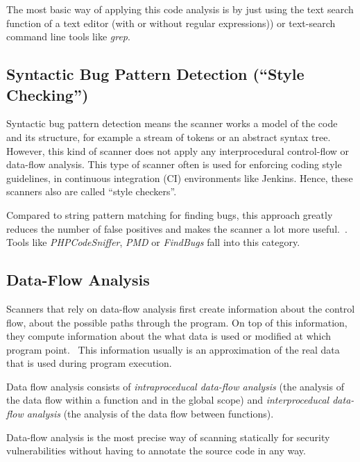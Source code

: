 The most basic way of applying this code analysis is by just using the text search function of a text editor (with or without regular expressions)) or text-search command line tools like \emph{grep}.


\subsection{Syntactic Bug Pattern Detection (``Style Checking'')}

Syntactic bug pattern detection means the scanner works a model of the code and its structure, for example a stream of tokens or an abstract syntax tree. However, this kind of scanner does not apply any interprocedural control-flow or data-flow analysis. This type of scanner often is used for enforcing coding style guidelines, \eg in continuous integration (CI) environments like Jenkins. Hence, these scanners also are called ``style checkers''.

Compared to string pattern matching for finding bugs, this approach greatly reduces the number of false positives and makes the scanner a lot more useful.~\cite{comparison-of-bug-finding-tools}. Tools like \emph{PHPCodeSniffer}, \emph{PMD} or \emph{FindBugs} fall into this category.


\subsection{Data-Flow Analysis}

Scanners that rely on data-flow analysis first create information about the control flow, \ie about the possible paths through the program. On top of this information, they compute information about the what data is used or modified at which program point.~\cite{data-flow-analysis} This information usually is an approximation of the real data that is used during program execution.

Data flow analysis consists of \emph{intraproceducal data-flow analysis} (\ie the analysis of the data flow within a function and in the global scope) and \emph{interproceducal data-flow analysis} (\ie the analysis of the data flow between functions).

Data-flow analysis is the most precise way of scanning statically for security vulnerabilities without having to annotate the source code in any way.

